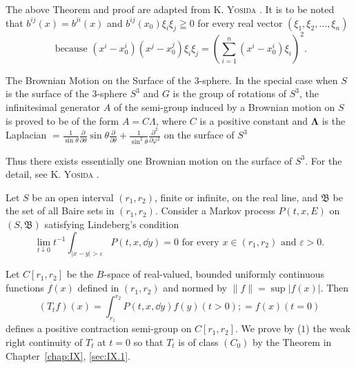 \begin{remarku} The above Theorem and proof are adapted from K. \textsc{Yosida} \cite{yosida363}. It is to be noted that $b^{ij}(x) = b^{ji}(x)$ and 
$b^{ij}(x_0)\xi_i\xi_j\geqq 0$ for every real vector $(\xi_1,\xi_2,\ldots ,\xi_n)$ 
\begin{equation}\label{eq:XIII.5.17}
\text{ because } (x ^{i} - x _{0} ^{i}) (x ^{j} - x _{0} ^{j}) \xi_{i} \xi_{j} = \left(\sum\limits_{i=1} ^{n} (x ^{i} - x _{0} ^{i}) \xi_{i}\right) ^{2}.
\end{equation}
\end{remarku}

The Brownian Motion on the Surface of the $3$-sphere. In the special case when $S$ is the surface of the $3$-sphere $S^{3}$ and $G$ is the group of rotations of $S^{3}$, the infinitesimal generator $A$ of the semi-group induced by a Brownian motion on $S$ is proved to be of the form 
$A = C\Lambda$, where $C$ is a positive constant and $\pmb{\Lambda}$ is the Laplacian 
$= \frac{1}{\sin\theta}\frac{\partial}{\partial\theta}\sin \theta \frac{\partial}{\partial\theta} +\frac{1}{\sin^2\theta}\frac{\partial^2}{\partial\varphi^2}$ on the surface of $S^3$ 


Thus there exists essentially one Brownian motion on the surface of $S^{3}$. For the detail, see K. \textsc{Yosida} \cite{yosida370}. 


\label{sec:XIII.6}

Let $S$ be an open interval $(r_1, r_2)$, finite or infinite, on the real line, and $\mathfrak{B}$ be the set of all Baire sets in $(r_1, r_2)$. Consider a Markov process $P(t, x, E)$ on $(S, \mathfrak{B})$ satisfying Lindeberg's condition 
\begin{equation}\label{eq:XIII.6.1}
\lim\limits_{t \downarrow 0} t^{-1} \int_{|x - y| > \varepsilon} P(t, x, \dd y) = 0 \text{ for every } x \in (r_1, r_2) \text{ and } \varepsilon > 0.
\end{equation}


Let $C[r_1, r_2]$ be the $B$-space of real-valued, bounded uniformly continuous functions $f(x)$ defined in $(r_1, r_2)$ and normed by $\|f\| = \sup |f(x)|$. Then 
\begin{equation}\label{eq:XIII.6.2}
(T _{t} f) (x) = \int_ {r _{1}} ^ {r _{2}} P (t, x, \dd y) f (y) (t > 0); = f (x) (t = 0)
\end{equation}
defines a positive contraction semi-group on $C[r_1, r_2]$. We prove by ($1$) the weak right continuity of $T_t$ at $t = 0$ so that $T_t$ is of class $(C_0)$ by the Theorem in Chapter~\ref{chap:IX}, \ref{sec:IX.1}. 

